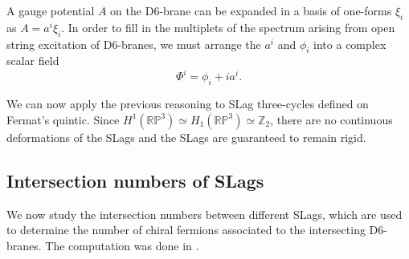 A gauge potential $A$ on the D$6$-brane can be expanded in a basis of one-forms $\xi_i$ as $A=a^i \xi_i$.
In order to fill in the multiplets of the spectrum arising from open string excitation of D6-branes,
we must arrange the $a^i$ and $\phi_i$ into a complex scalar field
\begin{equation}
 \Phi^i = \phi_i + ia^i. 
\end{equation}

We can now apply the previous reasoning to SLag three-cycles defined on Fermat's quintic.
Since $H^1(\mathbb{RP}^3)\simeq H_1(\mathbb{RP}^3)\simeq\mathbb Z_2$, there are no continuous deformations of the
SLags and the SLags are guaranteed to remain rigid.

\subsection{Intersection numbers of SLags}
We now study the intersection numbers between different SLags, which are used to determine the number 
of chiral fermions associated to the intersecting D6-branes.
The computation was done in \cite{Brunner2000}.

